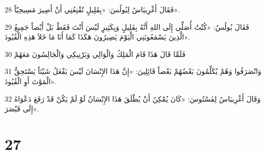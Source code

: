 \par 28 فَقَالَ أَغْرِيبَاسُ لِبُولُسَ: «بِقَلِيلٍ تُقْنِعُنِي أَنْ أَصِيرَ مَسِيحِيّاً».
\par 29 فَقَالَ بُولُسُ: «كُنْتُ أُصَلِّي إِلَى اللهِ أَنَّهُ بِقَلِيلٍ وَبِكَثِيرٍ لَيْسَ أَنْتَ فَقَطْ بَلْ أَيْضاً جَمِيعُ الَّذِينَ يَسْمَعُونَنِي الْيَوْمَ يَصِيرُونَ هَكَذَا كَمَا أَنَا مَا خَلاَ هَذِهِ الْقُيُودَ».
\par 30 فَلَمَّا قَالَ هَذَا قَامَ الْمَلِكُ وَالْوَالِي وَبَرْنِيكِي وَالْجَالِسُونَ مَعَهُمْ
\par 31 وَانْصَرَفُوا وَهُمْ يُكَلِّمُونَ بَعْضُهُمْ بَعْضاً قَائِلِينَ: «إِنَّ هَذَا الإِنْسَانَ لَيْسَ يَفْعَلُ شَيْئاً يَسْتَحِقُّ الْمَوْتَ أَوِ الْقُيُودَ».
\par 32 وَقَالَ أَغْرِيبَاسُ لِفَسْتُوسَ: «كَانَ يُمْكِنُ أَنْ يُطْلَقَ هَذَا الإِنْسَانُ لَوْ لَمْ يَكُنْ قَدْ رَفَعَ دَعْوَاهُ إِلَى قَيْصَرَ».

\chapter{27}

